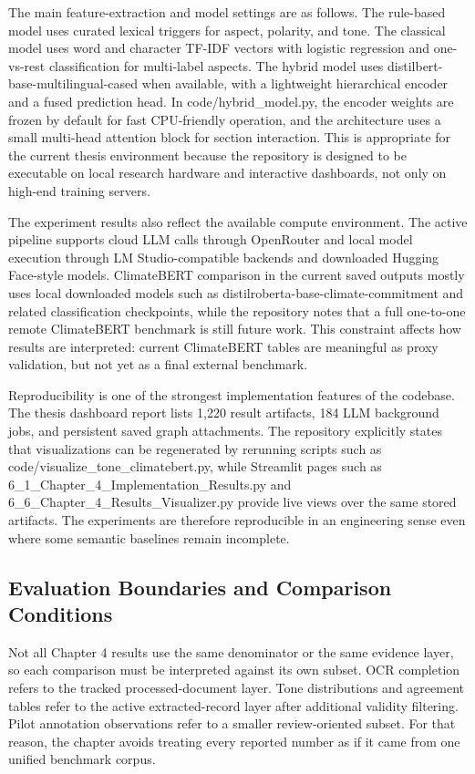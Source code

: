 The main feature-extraction and model settings are as follows. The rule-based model uses curated lexical triggers for aspect, polarity, and tone. The classical model uses word and character TF-IDF vectors with logistic regression and one-vs-rest classification for multi-label aspects. The hybrid model uses distilbert-base-multilingual-cased when available, with a lightweight hierarchical encoder and a fused prediction head. In code/hybrid\_model.py, the encoder weights are frozen by default for fast CPU-friendly operation, and the architecture uses a small multi-head attention block for section interaction. This is appropriate for the current thesis environment because the repository is designed to be executable on local research hardware and interactive dashboards, not only on high-end training servers.

The experiment results also reflect the available compute environment. The active pipeline supports cloud LLM calls through OpenRouter and local model execution through LM Studio-compatible backends and downloaded Hugging Face-style models. ClimateBERT comparison in the current saved outputs mostly uses local downloaded models such as distilroberta-base-climate-commitment and related classification checkpoints, while the repository notes that a full one-to-one remote ClimateBERT benchmark is still future work. This constraint affects how results are interpreted: current ClimateBERT tables are meaningful as proxy validation, but not yet as a final external benchmark.

Reproducibility is one of the strongest implementation features of the codebase. The thesis dashboard report lists 1,220 result artifacts, 184 LLM background jobs, and persistent saved graph attachments. The repository explicitly states that visualizations can be regenerated by rerunning scripts such as code/visualize\_tone\_climatebert.py, while Streamlit pages such as 6\_1\_Chapter\_4\_Implementation\_Results.py and 6\_6\_Chapter\_4\_Results\_Visualizer.py provide live views over the same stored artifacts. The experiments are therefore reproducible in an engineering sense even where some semantic baselines remain incomplete.

\subsection{Evaluation Boundaries and Comparison Conditions}

Not all Chapter 4 results use the same denominator or the same evidence layer, so each comparison must be interpreted against its own subset. OCR completion refers to the tracked processed-document layer. Tone distributions and agreement tables refer to the active extracted-record layer after additional validity filtering. Pilot annotation observations refer to a smaller review-oriented subset. For that reason, the chapter avoids treating every reported number as if it came from one unified benchmark corpus.

